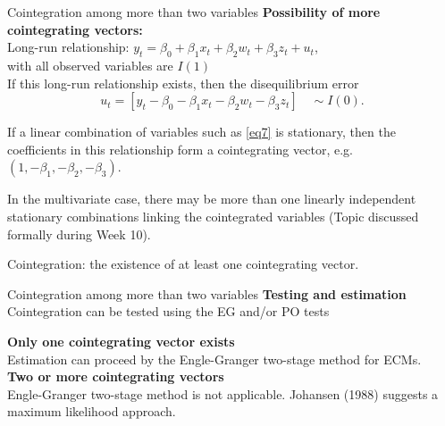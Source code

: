 \documentclass{beamer}
\begin{document}

\begin{frame}{Cointegration among more than two variables}
\textbf{Possibility of more cointegrating vectors:}\\
\medskip
Long-run relationship: $y_t= \beta_0 + \beta_1 x_t + \beta_2 w_t + \beta_3 z_t + u_t$,\\ with all observed variables are $I(1)$\\

\medskip
If this long-run relationship exists, then the disequilibrium error \\
\begin{equation}  \label{eq7}
u_t= [y_t - \beta_0 - \beta_1 x_t - \beta_2 w_t - \beta_3 z_t ]
\quad \sim I(0). 
\end{equation} 

\medskip
If a linear combination of variables such as \eqref{eq7} is stationary, then the coefficients in this relationship form a cointegrating vector, e.g. $(1,-\beta_{1},-\beta_{2},-\beta_{3})$. 

\medskip
In the multivariate case, there may be more than one linearly independent stationary combinations linking the cointegrated variables (Topic discussed formally during Week 10). 

\medskip
Cointegration: the existence of at least one cointegrating vector.

\end{frame}


\begin{frame}{Cointegration among more than two variables}
\textbf{Testing and estimation}\\
Cointegration can be tested using the EG and/or PO tests

\hspace{0.3cm}

\textbf{Only one cointegrating vector exists}\\
Estimation can proceed by the Engle-Granger two-stage method for ECMs. \\ 
\vspace{0.3cm}
\textbf{Two or more cointegrating vectors}\\
Engle-Granger two-stage method is not applicable. Johansen (1988) suggests a maximum likelihood approach. 
\end{frame}
\end{document}
